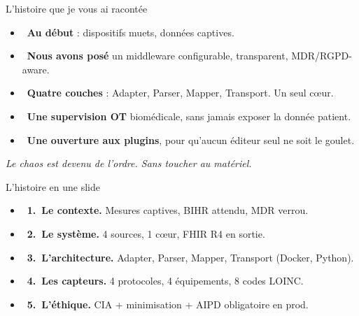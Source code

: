 \documentclass[10pt,aspectratio=169,xcolor={table}]{beamer}
\newcommand{\faHospital}{}\newcommand{\faHeartbeat}{}\newcommand{\faTint}{}%
\newcommand{\faUserShield}{}\newcommand{\faLock}{}\newcommand{\faServer}{}%
\newcommand{\faExclamationTriangle}{}\newcommand{\faCheckCircle}{}%
\newcommand{\faRoute}{}\newcommand{\faProjectDiagram}{}\newcommand{\faPython}{}%
\newcommand{\PartCurrent}{}
\newcommand{\ChCurrent}{}
\newcommand{\partref}[1]{\renewcommand{\PartCurrent}{#1}}
\newcommand{\chref}[1]{\renewcommand{\ChCurrent}{#1}}
\begin{document}
\partref{}
\chref{}
\begin{frame}{L'histoire que je vous ai racont\'ee}

\begin{itemize}[leftmargin=*, itemsep=0.4em]
  \item \textcolor{bridgealert}{\faExclamationTriangle}~\textbf{Au d\'ebut} : dispositifs muets, donn\'ees captives.
  \item \textcolor{bridgeblue}{\faProjectDiagram}~\textbf{Nous avons pos\'e} un middleware configurable, transparent, MDR/RGPD-aware.
  \item \textcolor{bridgeteal}{\faRoute}~\textbf{Quatre couches} : Adapter, Parser, Mapper, Transport. Un seul c\oe ur.
  \item \textcolor{bridgeblue}{\faUserMd}~\textbf{Une supervision OT} biom\'edicale, sans jamais exposer la donn\'ee patient.
  \item \textcolor{bridgegreen}{\faNetworkWired}~\textbf{Une ouverture aux plugins}, pour qu'aucun \'editeur seul ne soit le goulet.
\end{itemize}

\vspace{0.6em}
\centerline{\itshape\large\color{bridgeblue} Le chaos est devenu de l'ordre. Sans toucher au mat\'eriel.}
\end{frame}

\partref{}
\chref{}
\begin{frame}{L'histoire en une slide}

\begin{itemize}[label={}, leftmargin=*, itemsep=0.5em]
  \item \textcolor{bridgealert}{\faHospital}~\textbf{1.~Le contexte.} Mesures captives, BIHR attendu, MDR verrou.
  \item \textcolor{bridgeteal}{\faProjectDiagram}~\textbf{2.~Le syst\`eme.} 4 sources, 1 c\oe ur, FHIR R4 en sortie.
  \item \textcolor{bridgeblue}{\faPython}~\textbf{3.~L'architecture.} Adapter, Parser, Mapper, Transport (Docker, Python).
  \item \textcolor{bridgealert}{\faHeartbeat}~\textbf{4.~Les capteurs.} 4 protocoles, 4 \'equipements, 8 codes LOINC.
  \item \textcolor{bridgeblue}{\faUserShield}~\textbf{5.~L'\'ethique.} CIA + minimisation + AIPD obligatoire en prod.
\end{itemize}

\end{frame}
\end{document}
